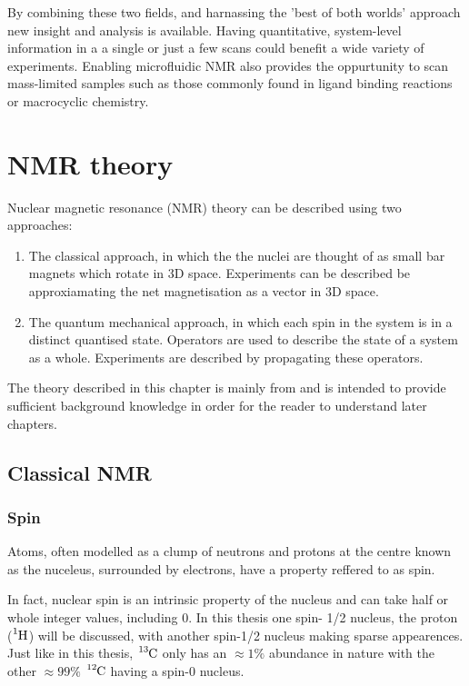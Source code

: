 By combining these two fields, and harnassing the 'best of both worlds' approach
new insight and analysis is available. Having quantitative, system-level information in a
a single or just a few scans could benefit a wide variety of experiments. Enabling microfluidic
NMR also provides the oppurtunity to scan mass-limited samples such as those commonly found in
ligand binding reactions\citep{Finch:2016gv} or macrocyclic chemistry\citep{RN81}.

\newpage

\section{NMR theory}

Nuclear magnetic resonance (NMR) theory can be described using two approaches:
\begin{enumerate}
  \item The classical approach, in which the the nuclei are thought of as small bar magnets which
  rotate in 3D space. Experiments can be described be approxiamating the net magnetisation as a
  vector in 3D space.
  \item The quantum mechanical approach, in which each spin in the system is in a distinct quantised state.
  Operators are used to describe the state of a system as a whole. Experiments are described by propagating
  these operators.
\end{enumerate}

The theory described in this chapter is mainly from \citep{RN135,RN136} and is intended to provide sufficient background
knowledge in order for the reader to understand later chapters.

\subsection{Classical NMR}

\subsubsection{Spin}

Atoms, often modelled as a clump of neutrons and protons at
the centre known as the nuceleus, surrounded by electrons, have a property reffered to as spin.

In fact, nuclear spin is an intrinsic property of the nucleus and can take half or whole
integer values, including $0$. In this thesis one spin- 1/2 nucleus, the proton ($\ce{^{1}H}$) will be discussed, with another spin-1/2 nucleus  making
sparse appearences. Just like in this thesis, $\ce{^{13}C}$ only has an $\approx{1}\%$
abundance in nature with the other $\approx{99}\%$ $\ce{^{12}C}$ having a spin-$0$
nucleus.

